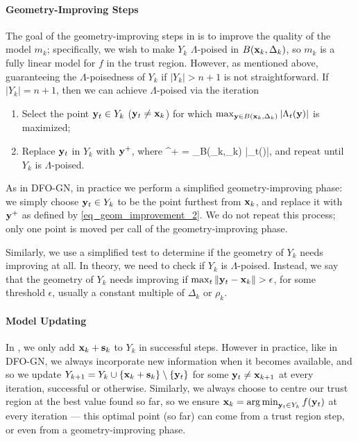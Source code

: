 \paragraph{Geometry-Improving Steps}
The goal of the geometry-improving steps in  is to improve the quality of the model $m_k$; specifically, we wish to make $Y_k$ $\Lambda$-poised in $B(\mathbf{x}_k,\Delta_k)$, so $m_k$ is a fully linear model for $f$ in the trust region.
However, as mentioned above, guaranteeing the $\Lambda$-poisedness of $Y_k$ if $|Y_k|>n+1$ is not straightforward.
If $|Y_k|=n+1$, then we can achieve $\Lambda$-poised via the iteration \cite[Algorithm 6.3]{Conn2009}
\begin{enumerate}
	\item Select the point $\mathbf{y}_t\in Y_k$ ($\mathbf{y}_t\neq\mathbf{x}_k$) for which $\max_{\mathbf{y}\in B(\mathbf{x}_k,\Delta_k)} |\Lambda_t(\mathbf{y})|$ is maximized;
	\item Replace $\mathbf{y}_t$ in $Y_k$ with $\mathbf{y}^+$, where 
	\be \by^+ = \argmax_{\by\in B(\bx_k,\Delta_k)} |\Lambda_t(\by)|, \label{eq_geom_improvement_2} \ee
	and repeat until $Y_k$ is $\Lambda$-poised.
\end{enumerate}
As in DFO-GN, in practice we perform a simplified geometry-improving phase: we simply choose $\mathbf{y}_t\in Y_k$ to be the point furthest from $\mathbf{x}_k$, and replace it with $\mathbf{y}^+$ as defined by \eqref{eq_geom_improvement_2}.
We do not repeat this process; only one point is moved per call of the geometry-improving phase.

Similarly, we use a simplified test to determine if the geometry of $Y_k$ needs improving at all.
In theory, we need to check if $Y_k$ is $\Lambda$-poised.
Instead, we say that the geometry of $Y_k$ needs improving if $\max_t \|\mathbf{y}_t-\mathbf{x}_k\| > \epsilon$, for some threshold $\epsilon$, usually a constant multiple of $\Delta_k$ or $\rho_k$.

\paragraph{Model Updating}
In , we only add $\mathbf{x}_k+\mathbf{s}_k$ to $Y_k$ in successful steps.
However in practice, like in DFO-GN, we always incorporate new information when it becomes available, and so we update $Y_{k+1}=Y_k\cup\{\mathbf{x}_k+\mathbf{s}_k\}\setminus\{\mathbf{y}_t\}$ for some $\mathbf{y}_t\neq\mathbf{x}_{k+1}$ at every iteration, successful or otherwise.
Similarly, we always choose to centre our trust region at the best value found so far, so we ensure $\mathbf{x}_k=\operatorname*{arg\,min}_{\mathbf{y}_t\in Y_k} f(\mathbf{y}_t)$ at every iteration --- this optimal point (so far) can come from a trust region step, or even from a geometry-improving phase.

